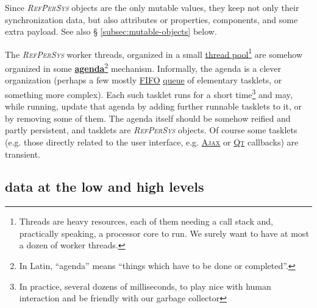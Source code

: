 \documentclass[11pt,a4paper,svgnames]{article}
\newcommand{\RefPerSys}{{\textit{\textsc{RefPerSys}}}}
\begin{document}
Since {\RefPerSys} objects are the only mutable values, they keep not
only their synchronization data, but also attributes or properties,
components, and some extra payload. See also \S
\ref{subsec:mutable-objects} below.

The {\RefPerSys} worker threads, organized in a small
\href{https://en.wikipedia.org/wiki/Thread_pool}{thread
  pool}\footnote{Threads are heavy resources, each of them needing a
call stack and, practically speaking, a processor core to run. We
surely want to have at most a dozen of worker threads.} are somehow
organized in some
\href{https://en.wikipedia.org/wiki/Agenda}{\textbf{agenda}}\footnote{In
Latin, ``agenda'' means ``things which have to be done or
completed''.}  mechanism. Informally, the agenda is a clever
organization (perhaps a few mostly
\href{https://en.wikipedia.org/wiki/FIFO}{FIFO}
\href{https://en.wikipedia.org/wiki/Queue\_(abstract\_data\_type)}{queue}
of elementary tasklets, or something more complex). Each such tasklet
runs for a short time\footnote{In practice, several dozens of
milliseconds, to play nice with human interaction and be friendly with
our garbage collector} and may, while running, update that agenda by
adding further runnable tasklets to it, or by removing some of
them. The agenda itself should be somehow reified and partly
persistent, and tasklets are {\RefPerSys} objects. Of course some
tasklets (e.g. those directly related to the user interface,
e.g. \href{https://en.wikipedia.org/wiki/Ajax_(programming)}{\textsc{Ajax}}
or \href{http://qt.io/}{\textsc{Qt}} callbacks) are transient.

\label{subsec:datalowhigh}
\subsection{data at the low and high levels}
\label{subsec:datalowhigh}
\end{document}

